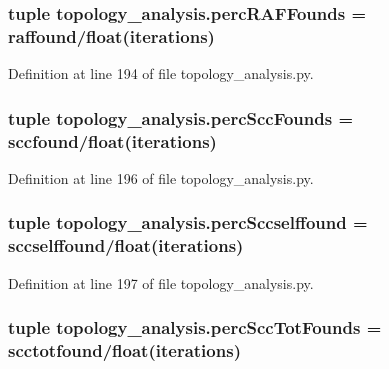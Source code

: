 \hypertarget{a00128_a51a66ce80f70aeab8bde70af9960e419}{
\subsubsection[{perc\-R\-A\-F\-Founds}]{\setlength{\rightskip}{0pt plus 5cm}tuple topology\-\_\-analysis.\-perc\-R\-A\-F\-Founds = {\bf raffound}/float({\bf iterations})}}\label{a00128_a51a66ce80f70aeab8bde70af9960e419}


Definition at line 194 of file topology\-\_\-analysis.\-py.

\hypertarget{a00128_a14f23c89de77042b80e78e1d9ab7b754}{
\subsubsection[{perc\-Scc\-Founds}]{\setlength{\rightskip}{0pt plus 5cm}tuple topology\-\_\-analysis.\-perc\-Scc\-Founds = {\bf sccfound}/float({\bf iterations})}}\label{a00128_a14f23c89de77042b80e78e1d9ab7b754}


Definition at line 196 of file topology\-\_\-analysis.\-py.

\hypertarget{a00128_a8bf55c62b8e7385526396a9003e343bb}{
\subsubsection[{perc\-Sccselffound}]{\setlength{\rightskip}{0pt plus 5cm}tuple topology\-\_\-analysis.\-perc\-Sccselffound = {\bf sccselffound}/float({\bf iterations})}}\label{a00128_a8bf55c62b8e7385526396a9003e343bb}


Definition at line 197 of file topology\-\_\-analysis.\-py.

\hypertarget{a00128_aee49954a6b9abb7c4bd677c17ed4013b}{
\subsubsection[{perc\-Scc\-Tot\-Founds}]{\setlength{\rightskip}{0pt plus 5cm}tuple topology\-\_\-analysis.\-perc\-Scc\-Tot\-Founds = {\bf scctotfound}/float({\bf iterations})}}\label{a00128_aee49954a6b9abb7c4bd677c17ed4013b}


